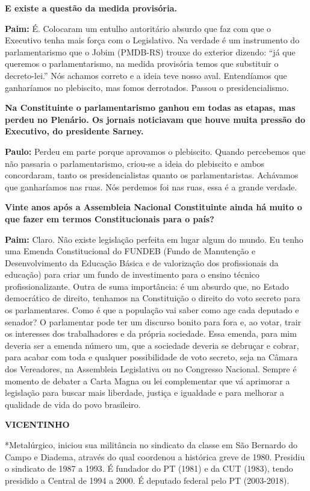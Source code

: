 \textbf{E existe a questão da medida provisória.}

\textbf{Paim:} É. Colocaram um entulho autoritário absurdo que faz com
que o Executivo tenha mais força com o Legislativo. Na verdade é um
instrumento do parlamentarismo que o Jobim (PMDB-RS) trouxe do exterior
dizendo: ``já que queremos o parlamentarismo, na medida provisória temos
que substituir o decreto-lei.'' Nós achamos correto e a ideia teve nosso
aval. Entendíamos que ganharíamos no plebiscito, mas fomos derrotados.
Passou o presidencialismo.

\textbf{Na Constituinte o parlamentarismo ganhou em todas as etapas, mas
perdeu no Plenário. Os jornais noticiavam que houve muita pressão do
Executivo, do presidente Sarney.}

\textbf{Paulo:} Perdeu em parte porque aprovamos o plebiscito. Quando
percebemos que não passaria o parlamentarismo, criou-se a ideia do
plebiscito e ambos concordaram, tanto os presidencialistas quanto os
parlamentaristas. Achávamos que ganharíamos nas ruas. Nós perdemos foi
nas ruas, essa é a grande verdade.

\textbf{Vinte anos após a Assembleia Nacional Constituinte ainda há
muito o que fazer em termos Constitucionais para o país?}

\textbf{Paim:} Claro. Não existe legislação perfeita em lugar algum do
mundo. Eu tenho uma Emenda Constitucional do FUNDEB (Fundo de Manutenção
e Desenvolvimento da Educação Básica e de valorização dos profissionais
da educação) para criar um fundo de investimento para o ensino técnico
profissionalizante. Outra de suma importância: é um absurdo que, no
Estado democrático de direito, tenhamos na Constituição o direito do
voto secreto para os parlamentares. Como é que a população vai saber
como age cada deputado e senador? O parlamentar pode ter um discurso
bonito para fora e, ao votar, trair os interesses dos trabalhadores e da
própria sociedade. Essa emenda, para mim deveria ser a emenda número um,
que a sociedade deveria se debruçar e cobrar, para acabar com toda e
qualquer possibilidade de voto secreto, seja na Câmara dos Vereadores,
na Assembleia Legislativa ou no Congresso Nacional. Sempre é momento de
debater a Carta Magna ou lei complementar que vá aprimorar a legislação
para buscar mais liberdade, justiça e igualdade e para melhorar a
qualidade de vida do povo brasileiro.

\textbf{VICENTINHO}

*​Metalúrgico, iniciou sua militância no sindicato da classe em São
Bernardo do Campo e Diadema, através do qual coordenou a histórica greve
de 1980. Presidiu o sindicato de 1987 a 1993. É fundador do PT (1981) e
da CUT (1983), tendo presidido a Central de 1994 a 2000. É deputado
federal pelo PT (2003-2018).

